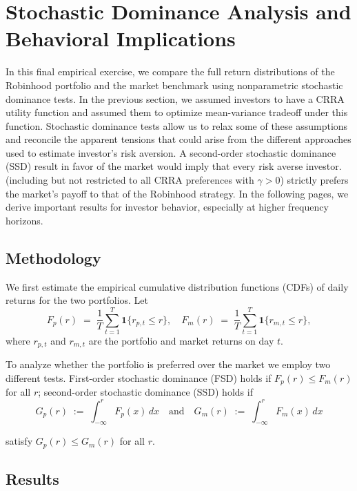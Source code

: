 \section{Stochastic Dominance Analysis and Behavioral Implications}

In this final empirical exercise, we compare the full return distributions of the Robinhood portfolio and the market benchmark using nonparametric stochastic dominance tests.
In the previous section, we assumed investors to have a CRRA utility function and assumed them to optimize mean-variance tradeoff under this function.
Stochastic dominance tests allow us to relax some of these assumptions and reconcile the apparent tensions that could arise from the different approaches used to estimate investor's risk aversion.  
A second-order stochastic dominance (SSD) result in favor of the market would imply that every risk averse investor.
(including but not restricted to all CRRA preferences with $\gamma>0$) strictly prefers the market's payoff to that of the Robinhood strategy.
In the following pages, we derive important results for investor behavior, especially at higher frequency horizons. 

\subsection{Methodology}
We first estimate the empirical cumulative distribution functions (CDFs) of daily returns for the two portfolios.  Let
\begin{equation}    
    F_{p}(r) \;=\; \frac{1}{T}\sum_{t=1}^{T}\mathbf{1}\{r_{p,t}\le r\},
    \quad
    F_{m}(r) \;=\; \frac{1}{T}\sum_{t=1}^{T}\mathbf{1}\{r_{m,t}\le r\},
\end{equation}
where $r_{p,t}$ and $r_{m,t}$ are the portfolio and market returns on day $t$.  

To analyze whether the portfolio is preferred over the market we employ two different tests.
First-order stochastic dominance (FSD) holds if $F_{p}(r)\le F_{m}(r)$ for all $r$; 
second-order stochastic dominance (SSD) holds if
\begin{equation}    
    G_{p}(r) \;:=\;\int_{-\infty}^{r}F_{p}(x)\,dx
    \quad\text{and}\quad
    G_{m}(r)\;:=\;\int_{-\infty}^{r}F_{m}(x)\,dx
\end{equation}

satisfy $G_{p}(r)\le G_{m}(r)$ for all $r$.


\subsection{Results}
